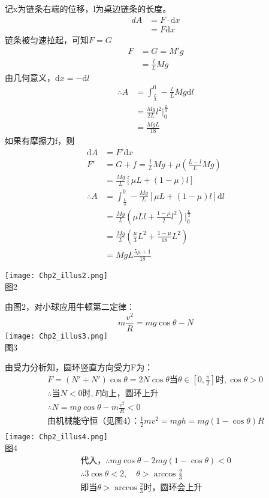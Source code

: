 \documentclass[b5paper,opensource]{./template/qyxf-book}
\newcommand{\di}[1]{\mathrm{d}#1}
\begin{document}

\solve
记x为链条右端的位移，l为桌边链条的长度。
\begin{align*}
dA	&=F\cdot\di{x}\\
&=F\di{x}
\end{align*}
链条被匀速拉起，可知$F=G$
\begin{align*}
F	&=G=M'g\\
&=\frac{l}{L}Mg
\end{align*}
由几何意义，$\di{x}=-\di{l}$
\begin{align*}
\therefore A&=\int_{\frac{L}{3}}^{0} -\frac{l}{L}Mg\di{l}\\
&=\frac{Mg}{2L}l^2\left.\right|_{0}^{\frac{L}{3}}\\
&=\frac{MgL}{18}
\end{align*}
如果有摩擦力f，则
\begin{align*}
\di{A}	&=F'\di{x}\\
F'		&=G+f=\frac{l}{L}Mg+\mu\left(\frac{L-l}{L}Mg\right)\\
&=\frac{Mg}{L}[\mu L+(1-\mu)l]\\
\therefore A&=\int_{\frac{L}{3}}^{0} -\frac{Mg}{L}[\mu L+(1-\mu)l] \di{l}\\
&=\frac{Mg}{L}\left(\mu Ll+\frac{1-\mu}{2}l^2\right)\left.\right|_{0}^{\frac{L}{3}}\\
&=\frac{Mg}{L}\left(\frac{\mu}{3}L^2+\frac{1-\mu}{18}L^2\right)\\
&=MgL\frac{5\mu +1}{18}
\end{align*}


\solve \centering\texttt{[image: Chp2\_illus2.png]}\\
图2\\
\raggedright 由图2，对小球应用牛顿第二定律：
\[m\frac{v^2}{R}=mg\cos\theta-N\]
\centering\texttt{[image: Chp2\_illus3.png]}\\
图3\\
\raggedright 由受力分析知，圆环竖直方向受力F为：
\begin{gather*}
F=(N'+N')\cos\theta=2N\cos\theta
\text{当}\theta\in[0,\frac{\pi}{2}]\text{时},\cos\theta>0\\
\therefore\text{当}N<0\text{时},F\text{向上，圆环上升}\\
\therefore N=mg\cos\theta-m\frac{v^2}{R}<0\\
\text{由机械能守恒（见图4）：}\frac{1}{2}mv^2=mgh=mg(1-\cos\theta)R\\
\end{gather*}
\centering\texttt{[image: Chp2\_illus4.png]}\\
图4
\begin{gather*}
\text{代入，}\therefore mg\cos\theta-2mg(1-\cos\theta)<0\\
\therefore 3\cos\theta<2,\quad \theta>\arccos\frac{2}{3}\\
\text{即当}\theta>\arccos\frac{2}{3}\text{时，圆环会上升}
\end{gather*}
\raggedright
\end{document}
